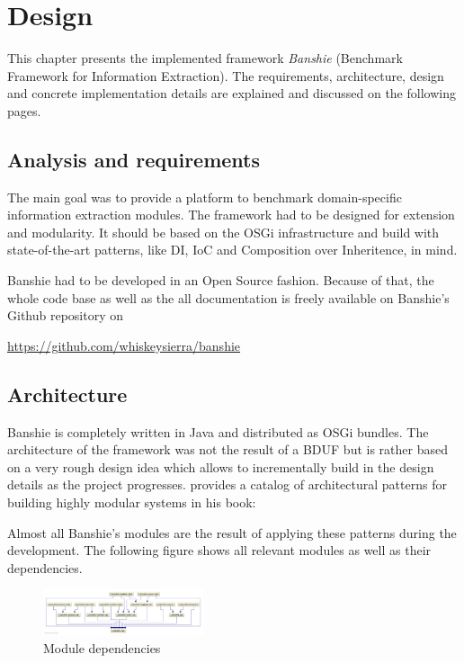 \section{Design}
\label{sec:design}

This chapter presents the implemented framework \textit{Banshie} (Benchmark Framework for Information Extraction). The requirements, architecture, design and concrete implementation details are explained and discussed on the following pages.

\subsection{Analysis and requirements}
The main goal was to provide a platform to benchmark domain-specific information extraction modules. The framework had to be designed for extension and modularity. It should be based on the OSGi infrastructure and build with state-of-the-art patterns, like \gls{DI}, \gls{IoC} and Composition over Inheritence, in mind.

Banshie had to be developed in an Open Source fashion. Because of that, the whole code base as well as the all documentation is freely available on Banshie's Github repository on

\url{https://github.com/whiskeysierra/banshie}

\subsection{Architecture}
Banshie is completely written in Java and distributed as OSGi bundles. The architecture of the framework was not the result of a \gls{BDUF} but is rather based on a very rough design idea which allows to incrementally build in the design details as the project progresses. \citeauthor{Knoernschild:2012} provides a catalog of architectural patterns for building highly modular systems in his book:


Almost all Banshie's modules are the result of applying these patterns during the development. The following figure shows all relevant modules as well as their dependencies.

\newpage
\begin{figure}[H]
\centering
\includegraphics[angle=90, width=0.42\textwidth]{module-dependencies.png}
\caption{Module dependencies}
\label{fig:module-dependencies}
\end{figure}

